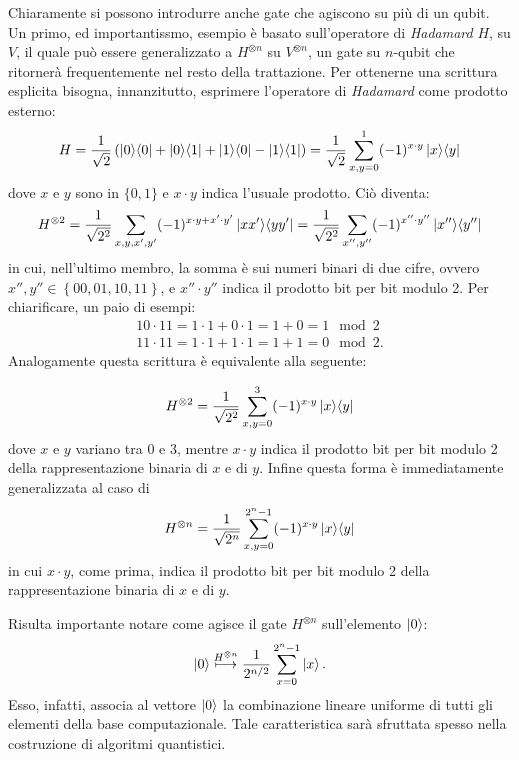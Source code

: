 Chiaramente si possono introdurre anche gate che agiscono su più di un qubit.
Un primo, ed importantissmo, esempio è basato sull'operatore di \textit{Hadamard} $H$, su $V$, il quale può essere generalizzato a $H^{\otimes n}$ su $V^{\otimes n}$, un gate su $n$-qubit che ritornerà frequentemente nel resto della trattazione.
Per ottenerne una scrittura esplicita bisogna, innanzitutto, esprimere l'operatore di \textit{Hadamard} come prodotto esterno:
\begin{align*}
 H = \frac{1}{\sqrt{2}} \left(\ket{0}\! \bra{0} + \ket{0}\! \bra{1} + \ket{1}\! \bra{0} - \ket{1}\! \bra{1} \right) = \frac{1}{\sqrt{2}} \sum_{x,y=0}^1 (-1)^{x \cdot y} \ket{x}\! \bra{y}
\end{align*}
dove $x$ e $y$ sono in $\{0,1\}$ e $x\cdot y$ indica l'usuale prodotto. Ciò diventa:
\begin{align*}
 H^{\otimes 2} = \frac{1}{\sqrt{2^2}}  \sum_{x,y,x',y'} (-1)^{x \cdot y + x' \cdot y'} \ket{x x'}\! \bra{y y'} = \frac{1}{\sqrt{2^2}}  \sum_{x'',y''} (-1)^{x'' \cdot y''} \ket{x''}\! \bra{y''}
\end{align*}
in cui, nell'ultimo membro, la somma è sui numeri binari di due cifre, ovvero $x'', y'' \in \left\{00, 01, 10, 11 \right\}$, e $x''\cdot y''$ indica il prodotto bit per bit modulo 2. Per chiarificare, un paio di esempi:
\begin{align*}
 10 \cdot 11 = 1 \cdot 1 + 0 \cdot 1 = 1 + 0 = 1 \mod 2\\
 11 \cdot 11 = 1 \cdot 1 + 1 \cdot 1 = 1 + 1 = 0 \mod 2.
\end{align*}
Analogamente questa scrittura è equivalente alla seguente:

\begin{align*}
 H^{\otimes 2} = \frac{1}{\sqrt{2^2}}  \sum_{x,y=0}^3 (-1)^{x \cdot y} \ket{x}\! \bra{y}
\end{align*}
dove $x$ e $y$ variano tra $0$ e $3$, mentre $x \cdot y$ indica il prodotto bit per bit modulo 2 della rappresentazione binaria di $x$ e di $y$.
Infine questa forma è immediatamente generalizzata al caso di
\begin{align}\label{eqn:H^n}
 H^{\otimes n} = \frac{1}{\sqrt{2^n}}  \sum_{x,y=0}^{2^n -1} (-1)^{x \cdot y} \ket{x}\! \bra{y}
\end{align}
in cui $x \cdot y$, come prima, indica il prodotto bit per bit modulo 2 della rappresentazione binaria di $x$ e di $y$.

Risulta importante notare come agisce il gate $H^{\otimes n}$ sull'elemento $\ket{0}$:
\begin{equation}
 \ket{0} \stackrel{H^{\otimes n}}{\longmapsto} \frac{1}{2^{n/2}} \sum_{x=0}^{2^n-1} \ket{x}.
\end{equation}
Esso, infatti, associa al vettore $\ket{0}$ la combinazione lineare uniforme di tutti gli elementi della base computazionale.
Tale caratteristica sarà sfruttata spesso nella costruzione di algoritmi quantistici.

